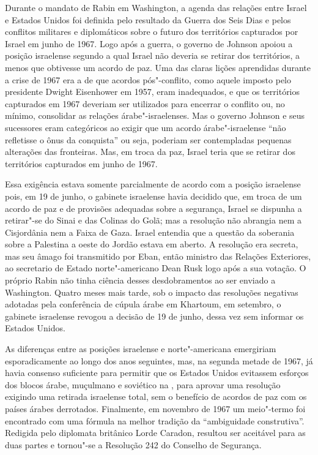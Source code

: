 Durante o mandato de Rabin em Washington, a agenda das relações entre
Israel e Estados Unidos foi definida pelo resultado da Guerra dos
Seis Dias e pelos conflitos militares e diplomáticos sobre o futuro dos
territórios capturados por Israel em junho de 1967. Logo após a guerra,
o governo de Johnson apoiou a posição israelense segundo a qual Israel
não deveria se retirar dos territórios, a menos que obtivesse um acordo
de paz. Uma das claras lições aprendidas durante a crise de 1967 era a
de que acordos pós"-conflito, como aquele imposto pelo presidente Dwight
Eisenhower em 1957, eram inadequados, e que os territórios capturados em
1967 deveriam ser utilizados para encerrar o conflito 
ou, no mínimo, consolidar as relações árabe"-israelenses. Mas o governo
Johnson e seus sucessores eram categóricos ao exigir que um acordo
árabe"-israelense ``não refletisse o ônus da conquista'' ou seja,
poderiam ser contempladas pequenas alterações das fronteiras. Mas, em
troca da paz, Israel teria que se retirar dos territórios capturados em
junho de 1967.

Essa exigência estava somente parcialmente de acordo com a posição
israelense pois, em 19 de junho, o gabinete israelense havia decidido
que, em troca de um acordo de paz e de provisões adequadas sobre a
segurança, Israel se dispunha a retirar"-se do Sinai e das Colinas do
Golã; mas a resolução não abrangia nem a Cisjordânia nem a Faixa de
Gaza. Israel entendia que a questão da soberania sobre a Palestina a
oeste do Jordão estava em aberto. A resolução era secreta, mas seu âmago
foi transmitido por Eban, então ministro das Relações Exteriores, ao secretario
de Estado norte"-americano Dean Rusk logo após a sua votação. O próprio
Rabin não tinha ciência desses desdobramentos ao ser enviado a
Washington. Quatro meses mais tarde, sob o impacto das resoluções
negativas adotadas pela conferência de cúpula árabe em Khartoum, em
setembro, o gabinete israelense revogou a decisão de 19 de junho, dessa
vez sem informar os Estados Unidos.

As diferenças entre as posições israelense e norte"-americana emergiriam
esporadicamente ao longo dos anos seguintes, mas, na segunda metade de
1967, já havia consenso suficiente para permitir que os Estados Unidos
evitassem esforços dos blocos árabe, muçulmano e soviético na , para
aprovar uma resolução exigindo uma retirada israelense total, sem o
benefício de acordos de paz com os países árabes derrotados. Finalmente,
em novembro de 1967 um meio"-termo foi encontrado com uma fórmula na
melhor tradição da ``ambiguidade construtiva''. Redigida pelo diplomata
britânico Lorde Caradon, resultou ser aceitável para as duas partes e
tornou"-se a Resolução 242 do Conselho de Segurança.


